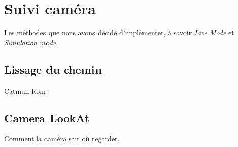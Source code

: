 \section{Suivi caméra}
Les méthodes que nous avons décidé d'implémenter, à savoir \textit{Live Mode} et \textit{Simulation mode}.

\subsection{Lissage du chemin}
Catmull Rom

\subsection{Camera LookAt}
Comment la caméra sait où regarder.
